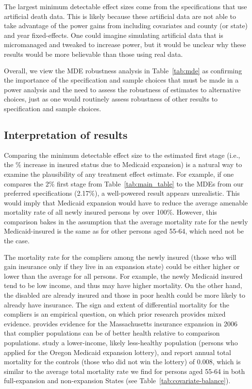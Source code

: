 \documentclass[12pt]{article}%
\begin{document}
The largest minimum detectable effect sizes come from the specifications that use artificial death data.
This is likely because these artificial data are not able to take advantage of the power gains from including covariates and county (or state) and year fixed-effects. 
One could imagine simulating artificial data that is micromanaged and tweaked to increase power, but it would be unclear why these results would be more believable than those using real data. 

Overall, we view the MDE robustness analysis in Table~\ref{tab:mde} as confirming the importance of the specification  and sample choices that must be made in a power analysis and the need to assess the robustness of estimates to alternative choices, just as one would routinely assess robustness of other results to specification and sample choices.  



\subsection{Interpretation of results}\label{sec:power-interpretation}

  Comparing the minimum detectable effect size to the  estimated first stage (i.e., the \% increase in insured status due to Medicaid expansion) is a natural way to examine the plausibility of any treatment effect estimate. 
  For example, if one compares the 2\% first stage from  Table~\ref{tab:main_table} to the MDEs from our preferred specifications (2.17\%), a well-powered result appears unrealistic. 
  This would imply that Medicaid expansion would have to reduce the average amenable mortality rate of all newly insured persons by over 100\%. 
  However, this comparison bakes in the assumption that the average mortality rate for the newly Medicaid-insured is the same as for other persons aged 55-64, which need not be the case. 

  The mortality rate for the compliers among the newly insured (those who will gain insurance only if they live in an expansion state) could be either higher or lower than the average for all persons. 
  For example, the newly Medicaid insured tend to be low income, and thus may have higher mortality. 
  On the other hand, the disabled are already insured and those in poor health could be more likely to already have insurance. 
  The sign and extent of differential mortality for the compliers is an empirical question, on which prior research provides mixed evidence. 
  \citet{kowalskiReconcilingSeeminglyContradictory2018a} provides evidence for the Massachusetts insurance expansion in 2006 that complier populations can be of better health relative to comparison populations. 
  \citet{finkelsteinOregonHealthInsurance2012c} study a lower-income, likely less-healthy population (persons who applied for the Oregon Medicaid expansion lottery), and report annual total mortality for the controls (those who did not win the lottery) of 0.008, which is similar to the average total mortality rate we find for persons aged 55-64 in both full-expansion and non-expansion States (see Table~\ref{tab:covariate-balance}). 
\end{document}
